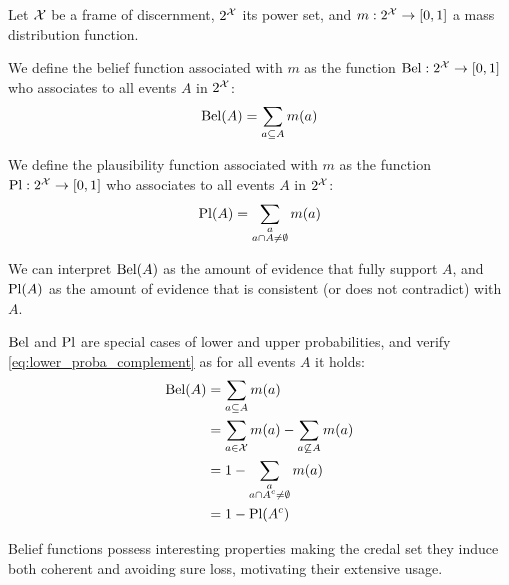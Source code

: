 \begin{definition}\label{def:belief_plausibility}
    Let ${\mathcal{X}}$ be a frame of discernment, $2^{\mathcal{X}}$ its power set, and $m:2^{\mathcal{X}}\rightarrow[0,1]$ a mass distribution function.
    
    We define the belief function associated with $m$ as the function ${\mathrm{Bel}}:2^{\mathcal{X}}\rightarrow[0,1]$ who associates to all events $A$ in $2^{\mathcal{X}}$:
    \begin{align*}
        {\mathrm{Bel}}(A)=\sum_{a\subseteq A} m(a)
    \end{align*}
    
    We define the plausibility function associated with $m$ as the function ${\mathrm{Pl}} :2^{\mathcal{X}}\rightarrow[0,1]$ who associates to all events $A$ in $2^{\mathcal{X}}$:
    \begin{align*}
        {\mathrm{Pl}}(A)=\sum_{\substack{a\\a\cap A\neq\emptyset}} m(a)
    \end{align*}
\end{definition}
We can interpret ${\mathrm{Bel}}(A)$ as the amount of evidence that fully support $A$, and ${\mathrm{Pl}}(A)$ as the amount of evidence that is consistent (or does not contradict) with $A$.

${\mathrm{Bel}}$ and ${\mathrm{Pl}}$ are special cases of lower and upper probabilities, and verify \eqref{eq:lower_proba_complement} as for all events $A$ it holds:
\begin{align*}
    {\mathrm{Bel}}(A)&=\sum_{a\subseteq A} m(a)\\
    &= \sum_{a\in {\mathcal{X}}} m(a) - \sum_{a\not\subseteq A} m(a)\\
    &= 1 - \sum_{\substack{a\\a\cap A^c\neq\emptyset}} m(a)\\
    &=1-{\mathrm{Pl}}(A^c)
\end{align*}

Belief functions possess interesting properties making the credal set they induce both coherent and avoiding sure loss, motivating their extensive usage.

